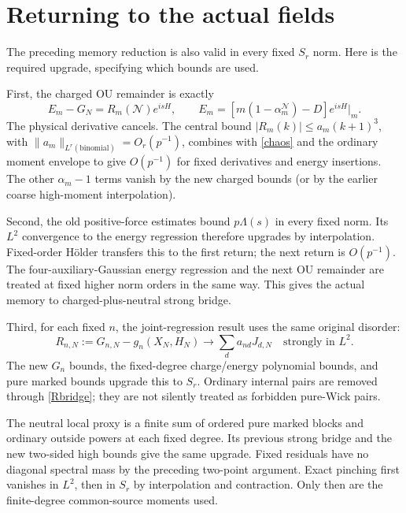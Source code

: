\documentclass[11pt]{article}
\newcommand{\NN}{\mathcal N}
\begin{document}
\newpage
\section{Returning to the actual fields}
The preceding memory reduction \cite{Transfer,Joint} is also valid
in every fixed $S_r$ norm. Here is the required upgrade, specifying
which bounds are used.

First, the charged OU remainder is exactly
\begin{equation}
 E_m-G_N=R_m(\NN)e^{isH},\qquad
 E_m=[m(1-\alpha_m^{\NN})-D]e^{isH}|_m.
\end{equation}
The physical derivative cancels. The central bound
$|R_m(k)|\le a_m(k+1)^3$, with
$\|a_m\|_{L^r(\mathrm{binomial})}=O_r(p^{-1})$, combines with
\eqref{chaos} and the ordinary moment envelope to give $O(p^{-1})$
for fixed derivatives and energy insertions. The other $\alpha_m-1$
terms vanish by the new charged bounds (or by the earlier coarse
high-moment interpolation).

Second, the old positive-force estimates bound $p\Lambda(s)$ in
every fixed norm. Its $L^2$ convergence to the energy regression
therefore upgrades by interpolation. Fixed-order H\"older transfers
this to the first return; the next return is $O(p^{-1})$.
The four-auxiliary-Gaussian energy regression and the next OU
remainder are treated at fixed higher norm orders in the same way.
This gives the actual memory to charged-plus-neutral strong bridge.

Third, for each fixed $n$, the joint-regression result uses the same
original disorder:
\begin{equation}\label{Rbridge}
 R_{n,N}:=G_{n,N}-g_n(X_N,H_N)
 \longrightarrow \sum_d a_{nd}J_{d,N}\quad\text{strongly in }L^2.
\end{equation}
The new $G_n$ bounds, the fixed-degree charge/energy polynomial
bounds, and pure marked bounds upgrade this to $S_r$.
Ordinary internal pairs are removed through \eqref{Rbridge}; they
are not silently treated as forbidden pure-Wick pairs.

The neutral local proxy is a finite sum of ordered pure marked
blocks and ordinary outside powers at each fixed degree. Its
previous strong bridge and the new two-sided high bounds give the
same upgrade. Fixed residuals have no diagonal spectral mass by the
preceding two-point argument. Exact pinching first vanishes in
$L^2$, then in $S_r$ by interpolation and contraction. Only then
are the finite-degree common-source moments used.
\end{document}
